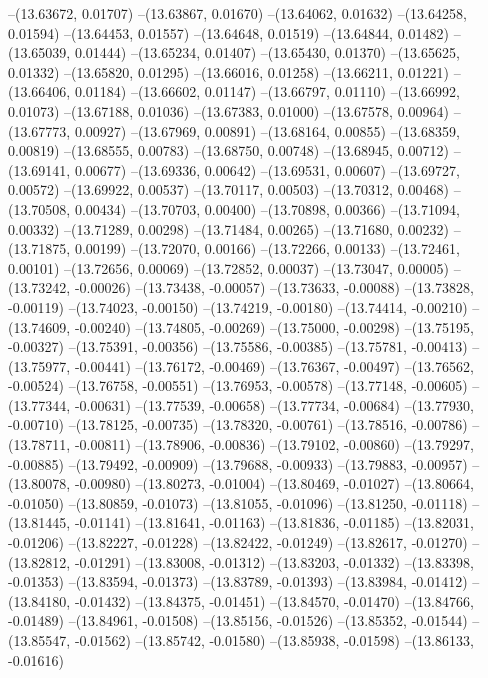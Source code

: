 --(13.63672, 0.01707)
--(13.63867, 0.01670)
--(13.64062, 0.01632)
--(13.64258, 0.01594)
--(13.64453, 0.01557)
--(13.64648, 0.01519)
--(13.64844, 0.01482)
--(13.65039, 0.01444)
--(13.65234, 0.01407)
--(13.65430, 0.01370)
--(13.65625, 0.01332)
--(13.65820, 0.01295)
--(13.66016, 0.01258)
--(13.66211, 0.01221)
--(13.66406, 0.01184)
--(13.66602, 0.01147)
--(13.66797, 0.01110)
--(13.66992, 0.01073)
--(13.67188, 0.01036)
--(13.67383, 0.01000)
--(13.67578, 0.00964)
--(13.67773, 0.00927)
--(13.67969, 0.00891)
--(13.68164, 0.00855)
--(13.68359, 0.00819)
--(13.68555, 0.00783)
--(13.68750, 0.00748)
--(13.68945, 0.00712)
--(13.69141, 0.00677)
--(13.69336, 0.00642)
--(13.69531, 0.00607)
--(13.69727, 0.00572)
--(13.69922, 0.00537)
--(13.70117, 0.00503)
--(13.70312, 0.00468)
--(13.70508, 0.00434)
--(13.70703, 0.00400)
--(13.70898, 0.00366)
--(13.71094, 0.00332)
--(13.71289, 0.00298)
--(13.71484, 0.00265)
--(13.71680, 0.00232)
--(13.71875, 0.00199)
--(13.72070, 0.00166)
--(13.72266, 0.00133)
--(13.72461, 0.00101)
--(13.72656, 0.00069)
--(13.72852, 0.00037)
--(13.73047, 0.00005)
--(13.73242, -0.00026)
--(13.73438, -0.00057)
--(13.73633, -0.00088)
--(13.73828, -0.00119)
--(13.74023, -0.00150)
--(13.74219, -0.00180)
--(13.74414, -0.00210)
--(13.74609, -0.00240)
--(13.74805, -0.00269)
--(13.75000, -0.00298)
--(13.75195, -0.00327)
--(13.75391, -0.00356)
--(13.75586, -0.00385)
--(13.75781, -0.00413)
--(13.75977, -0.00441)
--(13.76172, -0.00469)
--(13.76367, -0.00497)
--(13.76562, -0.00524)
--(13.76758, -0.00551)
--(13.76953, -0.00578)
--(13.77148, -0.00605)
--(13.77344, -0.00631)
--(13.77539, -0.00658)
--(13.77734, -0.00684)
--(13.77930, -0.00710)
--(13.78125, -0.00735)
--(13.78320, -0.00761)
--(13.78516, -0.00786)
--(13.78711, -0.00811)
--(13.78906, -0.00836)
--(13.79102, -0.00860)
--(13.79297, -0.00885)
--(13.79492, -0.00909)
--(13.79688, -0.00933)
--(13.79883, -0.00957)
--(13.80078, -0.00980)
--(13.80273, -0.01004)
--(13.80469, -0.01027)
--(13.80664, -0.01050)
--(13.80859, -0.01073)
--(13.81055, -0.01096)
--(13.81250, -0.01118)
--(13.81445, -0.01141)
--(13.81641, -0.01163)
--(13.81836, -0.01185)
--(13.82031, -0.01206)
--(13.82227, -0.01228)
--(13.82422, -0.01249)
--(13.82617, -0.01270)
--(13.82812, -0.01291)
--(13.83008, -0.01312)
--(13.83203, -0.01332)
--(13.83398, -0.01353)
--(13.83594, -0.01373)
--(13.83789, -0.01393)
--(13.83984, -0.01412)
--(13.84180, -0.01432)
--(13.84375, -0.01451)
--(13.84570, -0.01470)
--(13.84766, -0.01489)
--(13.84961, -0.01508)
--(13.85156, -0.01526)
--(13.85352, -0.01544)
--(13.85547, -0.01562)
--(13.85742, -0.01580)
--(13.85938, -0.01598)
--(13.86133, -0.01616)
